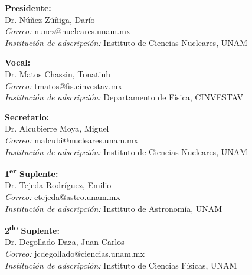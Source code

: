 \documentclass[11pt,twoside,openright,spanish]{report}
\numberwithin{equation}{chapter}
\numberwithin{figure}{chapter}
\numberwithin{table}{chapter}
\newenvironment{changemargin}[3]{
	\begin{list}{}{
			\setlength{\topsep}{#3}
			\setlength{\leftmargin}{#1}
			\setlength{\rightmargin}{#2}
			\setlength{\listparindent}{\parindent}
			\setlength{\itemindent}{\parindent}
			\setlength{\parsep}{\parskip}
		}
		\item[]}{\end{list}}
\begin{document}
\begin{changemargin}{1cm}{0cm}{1cm}
\begin{description}
		\item[]\textbf{Presidente:}\\
		Dr. Núñez Zúñiga, Darío\\
		\textit{Correo:} nunez@nucleares.unam.mx\\
		\textit{Institución de adscripción:} Instituto de Ciencias Nucleares, UNAM
		\item[]\textbf{Vocal:}\\
		Dr. Matos Chassin, Tonatiuh\\
		\textit{Correo:} tmatos@fis.cinvestav.mx \\
		\textit{Institución de adscripción:} Departamento de Física, CINVESTAV
		\item[]\textbf{Secretario:}\\
		Dr. Alcubierre Moya, Miguel\\
		\textit{Correo:} malcubi@nucleares.unam.mx\\
		\textit{Institución de adscripción:} Instituto de Ciencias Nucleares, UNAM
		\item[]\textbf{1\textsuperscript{er} Suplente:}\\
		Dr. Tejeda Rodríguez, Emilio\\
		\textit{Correo:} etejeda@astro.unam.mx\\
		\textit{Institución de adscripción:} Instituto de Astronomía, UNAM
		\item[]\textbf{2\textsuperscript{do} Suplente:}\\
		Dr. Degollado Daza, Juan Carlos\\
		\textit{Correo:} jcdegollado@ciencias.unam.mx\\
		\textit{Institución de adscripción:} Instituto de Ciencias Físicas, UNAM
	\end{description}
\thispagestyle{empty}
\end{changemargin}


{}
\ChTitleVar{\raggedright\Large\sffamily\bfseries}

\evensidemargin 0in 
\oddsidemargin 0.6in

\newpage{\ } 
\thispagestyle{empty}
\end{document}
